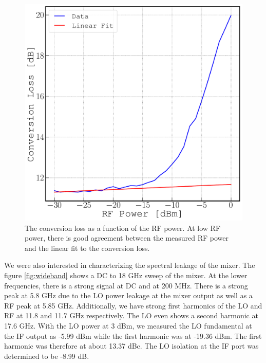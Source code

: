 \documentclass[twocolumn, aps, floatfix]{revtex4-1}
\begin{document}
\begin{figure}[!htbp]
    \includegraphics[scale=0.35]{compression_point_fitted.pdf}
    \caption{The conversion loss as a function of the RF power. At low RF power, there is good agreement between the measured RF power and the linear fit to the conversion loss.}
    \label{fig:compressionpoint}
\end{figure}


We were also interested in characterizing the spectral leakage of the mixer. The figure \ref{fig:wideband} shows a DC to 18 GHz sweep of the mixer. At the lower frequencies, there is a strong signal at DC and at 200 MHz. There is a strong peak at 5.8 GHz due to the LO power leakage at the mixer output as well as a RF peak at 5.85 GHz. Additionally, we have strong first harmonics of the LO and RF at 11.8 and 11.7 GHz respectively. The LO even shows a second harmonic at 17.6 GHz. With the LO power at 3 dBm, we measured the LO fundamental at the IF output as -5.99 dBm  while the first harmonic was at -19.36 dBm. The first harmonic was therefore at about 13.37 dBc. The LO isolation at the IF port was determined to be -8.99 dB.
\end{document}
